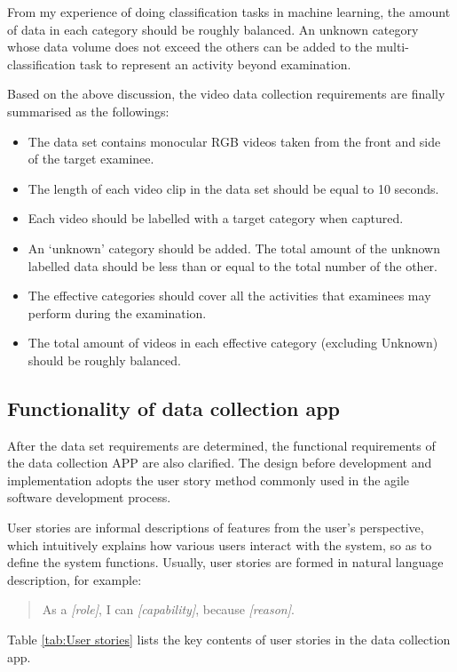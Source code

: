 From my experience of doing classification tasks in machine learning, the amount of data in each category should be roughly balanced.
An unknown category whose data volume does not exceed the others can be added to the multi-classification task to represent an activity beyond examination.

Based on the above discussion, the video data collection requirements are finally summarised as the followings:

\begin{itemize}
    \item The data set contains monocular RGB videos taken from the front and side of the target examinee.
    \item The length of each video clip in the data set should be equal to 10 seconds.
    \item Each video should be labelled with a target category when captured.
    \item An `unknown' category should be added. The total amount of the unknown labelled data should be less than or equal to the total number of the other.
    \item The effective categories should cover all the activities that examinees may perform during the examination.
    \item The total amount of videos in each effective category (excluding Unknown) should be roughly balanced.
\end{itemize}

\subsection{Functionality of data collection app}
After the data set requirements are determined, the functional requirements of the data collection APP are also clarified.
The design before development and implementation adopts the user story method commonly used in the agile software development process.

User stories are informal descriptions of features from the user's perspective, which intuitively explains how various users interact with the system, so as to define the system functions.
Usually, user stories are formed in natural language description, for example:
\begin{quote}
    As a \textit{[role]}, I can \textit{[capability]}, because \textit{[reason]}.
\end{quote}
Table \ref{tab:User stories} lists the key contents of user stories in the data collection app.


